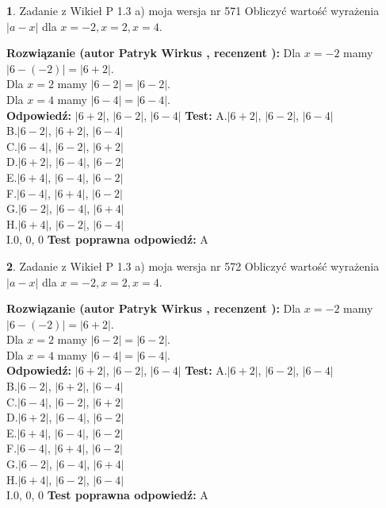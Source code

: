 \documentclass[12pt, a4paper]{article}
\theoremstyle{definition} %
\newtheorem{zad}{}
\newcommand{\zadStart}[1]{\begin{zad}#1\newline}
\newcommand{\zadStop}{\end{zad}}
\newcommand{\rozwStart}[2]{\noindent \textbf{Rozwiązanie (autor #1 , recenzent #2): }\newline}
\newcommand{\rozwStop}{\newline}
\newcommand{\odpStart}{\noindent \textbf{Odpowiedź:}\newline}
\newcommand{\odpStop}{\newline}
\newcommand{\testStart}{\noindent \textbf{Test:}\newline}
\newcommand{\testStop}{\newline}
\newcommand{\kluczStart}{\noindent \textbf{Test poprawna odpowiedź:}\newline}
\newcommand{\kluczStop}{\newline}
\begin{document}
\zadStart{Zadanie z Wikieł P 1.3 a) moja wersja nr 571}
Obliczyć wartość wyrażenia $|a - x|$ dla $x=-2,x=2,x=4$.
\zadStop
\rozwStart{Patryk Wirkus}{}
Dla $x = -2$ mamy $|6 - (-2)| = |6 + 2|$.\\
Dla $x = 2$ mamy $|6 - 2| = |6 - 2|$.\\
Dla $x = 4$ mamy $|6 - 4| = |6 - 4|$.\\
\rozwStop
\odpStart
$|6 + 2|$, $|6 - 2|$, $|6 - 4|$
\odpStop
\testStart
A.$|6 + 2|$, $|6 - 2|$, $|6 - 4|$\\
B.$|6 - 2|$, $|6 + 2|$, $|6 - 4|$\\
C.$|6 - 4|$, $|6 - 2|$, $|6 + 2|$\\
D.$|6 + 2|$, $|6 - 4|$, $|6 - 2|$\\
E.$|6 + 4|$, $|6 - 4|$, $|6 - 2|$\\
F.$|6 - 4|$, $|6 + 4|$, $|6 - 2|$\\
G.$|6 - 2|$, $|6 - 4|$, $|6 + 4|$\\
H.$|6 + 4|$, $|6 - 2|$, $|6 - 4|$\\
I.$0$, $0$, $0$
\testStop
\kluczStart
A
\kluczStop



\zadStart{Zadanie z Wikieł P 1.3 a) moja wersja nr 572}
Obliczyć wartość wyrażenia $|a - x|$ dla $x=-2,x=2,x=4$.
\zadStop
\rozwStart{Patryk Wirkus}{}
Dla $x = -2$ mamy $|6 - (-2)| = |6 + 2|$.\\
Dla $x = 2$ mamy $|6 - 2| = |6 - 2|$.\\
Dla $x = 4$ mamy $|6 - 4| = |6 - 4|$.\\
\rozwStop
\odpStart
$|6 + 2|$, $|6 - 2|$, $|6 - 4|$
\odpStop
\testStart
A.$|6 + 2|$, $|6 - 2|$, $|6 - 4|$\\
B.$|6 - 2|$, $|6 + 2|$, $|6 - 4|$\\
C.$|6 - 4|$, $|6 - 2|$, $|6 + 2|$\\
D.$|6 + 2|$, $|6 - 4|$, $|6 - 2|$\\
E.$|6 + 4|$, $|6 - 4|$, $|6 - 2|$\\
F.$|6 - 4|$, $|6 + 4|$, $|6 - 2|$\\
G.$|6 - 2|$, $|6 - 4|$, $|6 + 4|$\\
H.$|6 + 4|$, $|6 - 2|$, $|6 - 4|$\\
I.$0$, $0$, $0$
\testStop
\kluczStart
A
\kluczStop
\end{document}
